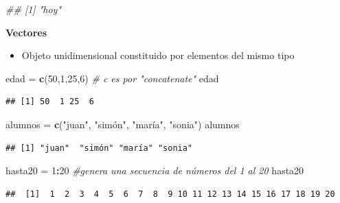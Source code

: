 \documentclass[]{article}
\newenvironment{Shaded}{\begin{snugshade}}{\end{snugshade}}
\newcommand{\CommentTok}[1]{\textcolor[rgb]{0.56,0.35,0.01}{\textit{#1}}}
\newcommand{\DecValTok}[1]{\textcolor[rgb]{0.00,0.00,0.81}{#1}}
\newcommand{\KeywordTok}[1]{\textcolor[rgb]{0.13,0.29,0.53}{\textbf{#1}}}
\newcommand{\NormalTok}[1]{#1}
\newcommand{\OperatorTok}[1]{\textcolor[rgb]{0.81,0.36,0.00}{\textbf{#1}}}
\newcommand{\StringTok}[1]{\textcolor[rgb]{0.31,0.60,0.02}{#1}}
\providecommand{\tightlist}{%
  \setlength{\itemsep}{0pt}\setlength{\parskip}{0pt}}
\begin{document}
\begin{Shaded}
\begin{Highlighting}[]
\CommentTok{## [1] "hoy"}
\end{Highlighting}
\end{Shaded}

\textbf{Vectores}

\begin{itemize}
\tightlist
\item
  Objeto unidimensional constituido por elementos del mismo tipo
\end{itemize}

\begin{Shaded}
\begin{Highlighting}[]
\NormalTok{edad =}\StringTok{ }\KeywordTok{c}\NormalTok{(}\DecValTok{50}\NormalTok{,}\DecValTok{1}\NormalTok{,}\DecValTok{25}\NormalTok{,}\DecValTok{6}\NormalTok{) }\CommentTok{# c es por "concatenate"}
\NormalTok{edad}
\end{Highlighting}
\end{Shaded}

\begin{verbatim}
## [1] 50  1 25  6
\end{verbatim}

\begin{Shaded}
\begin{Highlighting}[]
\NormalTok{alumnos =}\StringTok{ }\KeywordTok{c}\NormalTok{(}\StringTok{"juan"}\NormalTok{, }\StringTok{"simón", "}\NormalTok{maría}\StringTok{", "}\NormalTok{sonia}\StringTok{")}
\StringTok{alumnos}
\end{Highlighting}
\end{Shaded}

\begin{verbatim}
## [1] "juan"  "simón" "maría" "sonia"
\end{verbatim}

\begin{Shaded}
\begin{Highlighting}[]
\NormalTok{hasta20 =}\StringTok{ }\DecValTok{1}\OperatorTok{:}\DecValTok{20} \CommentTok{#genera una secuencia de números del 1 al 20}
\NormalTok{hasta20}
\end{Highlighting}
\end{Shaded}

\begin{verbatim}
##  [1]  1  2  3  4  5  6  7  8  9 10 11 12 13 14 15 16 17 18 19 20
\end{verbatim}
\end{document}
